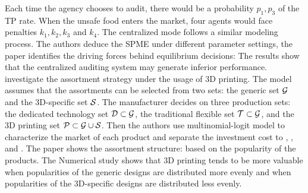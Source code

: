 \documentclass[10pt]{report}
\begin{document}
Each time the agency chooses to audit, there would be a probability $p_1,p_3$ of the TP rate. When the unsafe food enters the market, four agents would face penalties $k_1,k_2,k_3$ and $k_4$.
The centralized mode follows a similar modeling process. The authors deduce the SPME under different parameter settings,
the paper identifies the driving forces behind equilibrium decisions:
The results show that the centralized auditing system may generate inferior performance.\\
\cite{dong20223d} investigate the assortment strategy under the usage of 3D printing. The model assumes that the assortments can be selected from two sets:
the generic set $\mathcal{G}$ and the 3D-specific set $\mathcal{S}$. The manufacturer decides on three production sets: the dedicated
technology set $\mathcal{D}\subset\mathcal{G}$, the traditional flexible set $\mathcal{T} \subset \mathcal{G}$, and the 3D printing set $\mathcal{P} \subset \mathcal{G}\cup\mathcal{S}$.
Then the authors use multinomial-logit model to characterize the market of each product and separate the investment cost to , , and . The paper shows the assortment structure: based on the popularity of the products. The Numerical study shows that 3D printing tends to be more valuable when popularities of the generic designs are distributed more evenly and when popularities of the 3D-specific designs are distributed less evenly.
\end{document}
